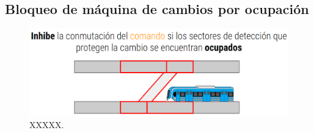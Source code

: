 \subsection{Bloqueo de máquina de cambios por ocupación}

\lipsum[1]
    \begin{figure}[!h]
        \centering
        \includegraphics[width=1\textwidth]{Figuras/ocupacion}
        \centering\caption{XXXXX.}
        \label{fig:ocupacion_1}
    \end{figure}
\lipsum[1]